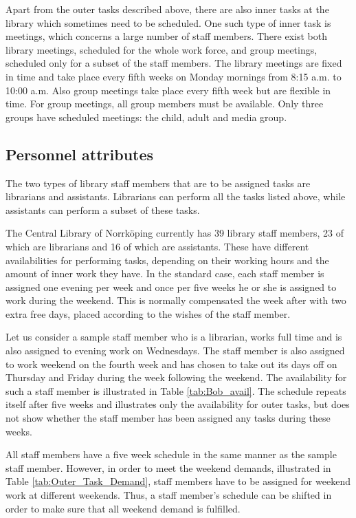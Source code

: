 Apart from the outer tasks described above, there are also inner tasks at the library which sometimes need to be scheduled. One such type of inner task is meetings, which concerns a large number of staff members. There exist both library meetings, scheduled for the whole work force, and group meetings, scheduled only for a subset of the staff members. The library meetings are fixed in time and take place every fifth weeks on Monday mornings from 8:15 a.m. to 10:00 a.m. Also group meetings take place every fifth week but are flexible in time. For group meetings, all group members must be available. Only three groups have scheduled meetings: the child, adult and media group.

\subsection{Personnel attributes}

The two types of library staff members that are to be assigned tasks are librarians and assistants. Librarians can perform all the tasks listed above, while assistants can perform a subset of these tasks.

The Central Library of Norrköping currently has 39 library staff members, 23 of which are librarians and 16 of which are assistants. These have different availabilities for performing tasks, depending on their working hours and the amount of inner work they have. In the standard case, each staff member is assigned one evening per week and once per five weeks he or she is assigned to work during the weekend. This is normally compensated the week after with two extra free days, placed according to the wishes of the staff member.

Let us consider a sample staff member who is a librarian, works full time and is also assigned to evening work on Wednesdays. The staff member is also assigned to work weekend on the fourth week and has chosen to take out its days off on Thursday and Friday during the week following the weekend. The availability for such a staff member is illustrated in Table \ref{tab:Bob_avail}. The schedule repeats itself after five weeks and illustrates only the availability for outer tasks, but does not show whether the staff member has been assigned any tasks during these weeks.

All staff members have a five week schedule in the same manner as the sample staff member. However, in order to meet the weekend demands, illustrated in Table \ref{tab:Outer_Task_Demand}, staff members have to be assigned for weekend work at different weekends. Thus, a staff member's schedule can be shifted in order to make sure that all weekend demand is fulfilled.


